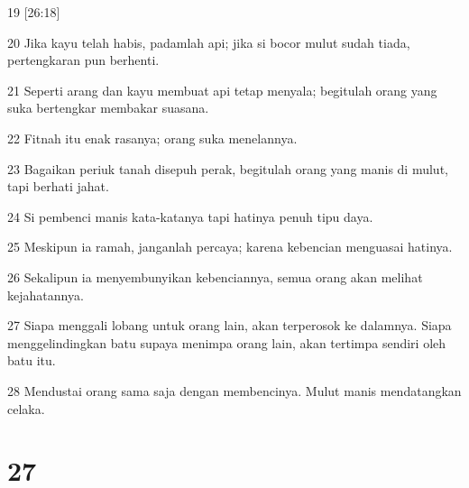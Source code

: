 \par 19 [26:18]
\par 20 Jika kayu telah habis, padamlah api; jika si bocor mulut sudah tiada, pertengkaran pun berhenti.
\par 21 Seperti arang dan kayu membuat api tetap menyala; begitulah orang yang suka bertengkar membakar suasana.
\par 22 Fitnah itu enak rasanya; orang suka menelannya.
\par 23 Bagaikan periuk tanah disepuh perak, begitulah orang yang manis di mulut, tapi berhati jahat.
\par 24 Si pembenci manis kata-katanya tapi hatinya penuh tipu daya.
\par 25 Meskipun ia ramah, janganlah percaya; karena kebencian menguasai hatinya.
\par 26 Sekalipun ia menyembunyikan kebenciannya, semua orang akan melihat kejahatannya.
\par 27 Siapa menggali lobang untuk orang lain, akan terperosok ke dalamnya. Siapa menggelindingkan batu supaya menimpa orang lain, akan tertimpa sendiri oleh batu itu.
\par 28 Mendustai orang sama saja dengan membencinya. Mulut manis mendatangkan celaka.

\chapter{27}

